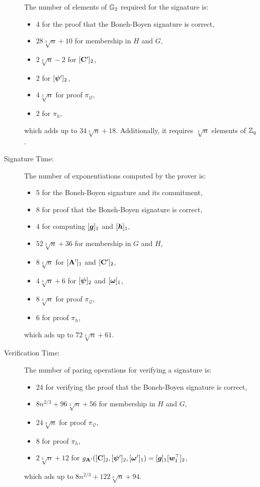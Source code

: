 \begin{description}
The number of elements of $\mathbb{G}_2$ required  for the signature is:
\begin{itemize}
\item 4 for the proof that the Boneh-Boyen signature is correct,
\item $28\sqrt[3]{n} + 10$ for membership in $H$ and $G$,
\item $2\sqrt[3]{n}-2$ for $[\mathbf{{C}}']_2$,
\item $2$ for $[{\boldsymbol{\psi}}']_2$,
\item $4\sqrt[3]{n}$ for proof  $\pi_{\mathcal{Q}}$,
\item $2$ for $\pi_h$,
\end{itemize}
which adds up to $34\sqrt[3]{n} + 18$. Additionally, it requires $\sqrt[3]{n}$ elements of $\mathbb{Z}_q$.
\item[Signature Time:] The number of exponentiations computed by the prover is:
\begin{itemize}
\item 5 for the Boneh-Boyen signature and its commitment,
\item 8 for proof that the Boneh-Boyen signature is correct,
\item 4 for computing $[{\boldsymbol{g}}]_1$ and $[{\boldsymbol{h}}]_1$,
\item $52\sqrt[3]{n}+36$ for membership in $G$ and $H$,
\item $8\sqrt[3]{n}$ for $[\mathbf{{A}}']_1$ and $[\mathbf{{C}}']_2$,
\item $4\sqrt[3]{n}+6$ for $[{\boldsymbol{\psi}}]_2$ and $[{\boldsymbol{\omega}}]_1$, 
\item $8\sqrt[3]{n}$ for proof $\pi_{\mathcal{Q}}$,
\item $6$ for proof $\pi_{h}$,
\end{itemize}
which ads up to $72\sqrt[3]{n}+61$.
\item[Verification Time:] The number of paring operations for verifying a signature is:
\begin{itemize}
\item 24 for verifying the proof that the Boneh-Boyen signature is correct,
\item $8n^{2/3} + 96\sqrt[3]{n} + 56$ for membership in $H$ and $G$,
\item $24\sqrt[3]{n}$ for proof $\pi_{\mathcal{Q}}$,
\item $8$ for proof $\pi_h$,
\item $2\sqrt[3]{n}+12$ for $g_{\mathbf{{A}}'}([\mathbf{{C}}]_2,[{\boldsymbol{\psi}}']_2,[{\boldsymbol{\omega}}']_1)=[{\boldsymbol{g}}]_1[{\boldsymbol{w}}_1^\top]_2$,
\end{itemize}
which ads up to $8n^{2/3} + 122\sqrt[3]{n} + 94$.
\end{description}